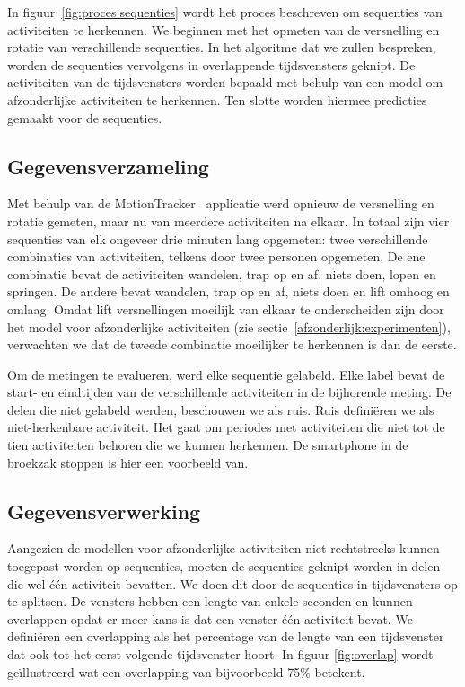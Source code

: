 \documentclass{article}
\begin{document}
In figuur~\ref{fig:proces:sequenties} wordt het proces beschreven om sequenties van activiteiten te herkennen. We beginnen met het opmeten van de versnelling en rotatie van verschillende sequenties. In het algoritme dat we zullen bespreken, worden de sequenties vervolgens in overlappende tijdsvensters geknipt. De activiteiten van de tijdsvensters worden bepaald met behulp van een model om afzonderlijke activiteiten te herkennen. Ten slotte worden hiermee predicties gemaakt voor de sequenties.

\subsection{Gegevensverzameling}
\label{seq:gegevens}

Met behulp van de MotionTracker~\cite{meert and schietgat:motiontracker} applicatie werd opnieuw de versnelling en rotatie gemeten, maar nu van meerdere activiteiten na elkaar. In totaal zijn vier sequenties van elk ongeveer drie minuten lang opgemeten: twee verschillende combinaties van activiteiten, telkens door twee personen opgemeten. De ene combinatie bevat de activiteiten wandelen, trap op en af, niets doen, lopen en springen. De andere bevat wandelen, trap op en af, niets doen en lift omhoog en omlaag. Omdat lift versnellingen moeilijk van elkaar te onderscheiden zijn door het model voor afzonderlijke activiteiten (zie sectie~\ref{afzonderlijk:experimenten}), verwachten we dat de tweede combinatie moeilijker te herkennen is dan de eerste.

Om de metingen te evalueren, werd elke sequentie gelabeld. Elke label bevat de start- en eindtijden van de verschillende activiteiten in de bijhorende meting. De delen die niet gelabeld werden, beschouwen we als ruis. Ruis defini\"eren we als niet-herkenbare activiteit. Het gaat om periodes met activiteiten die niet tot de tien activiteiten behoren die we kunnen herkennen. De smartphone in de broekzak stoppen is hier een voorbeeld van.

\subsection{Gegevensverwerking}

Aangezien de modellen voor afzonderlijke activiteiten niet rechtstreeks kunnen toegepast worden op sequenties, moeten de sequenties geknipt worden in delen die wel \'e\'en activiteit bevatten. We doen dit door de sequenties in tijdsvensters op te splitsen. De vensters hebben een lengte van enkele seconden en kunnen overlappen opdat er meer kans is dat een venster \'e\'en activiteit bevat. We defini\"eren een overlapping als het percentage van de lengte van een tijdsvenster dat ook tot het eerst volgende tijdsvenster hoort. In figuur \ref{fig:overlap} wordt ge\"illustreerd wat een overlapping van bijvoorbeeld 75\% betekent.
\end{document}
